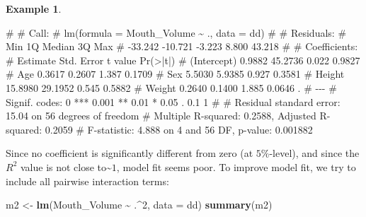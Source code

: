 \documentclass[
  a4paper,
]{article}
\newenvironment{Shaded}{\begin{snugshade}}{\end{snugshade}}
\newcommand{\AttributeTok}[1]{\textcolor[rgb]{0.13,0.29,0.53}{#1}}
\newcommand{\DecValTok}[1]{\textcolor[rgb]{0.00,0.00,0.81}{#1}}
\newcommand{\FunctionTok}[1]{\textcolor[rgb]{0.13,0.29,0.53}{\textbf{#1}}}
\newcommand{\NormalTok}[1]{#1}
\newcommand{\OtherTok}[1]{\textcolor[rgb]{0.56,0.35,0.01}{#1}}
\newcommand{\SpecialCharTok}[1]{\textcolor[rgb]{0.81,0.36,0.00}{\textbf{#1}}}
\theoremstyle{definition}
\theoremstyle{definition}
\newtheorem{example}{Example}[section]
\theoremstyle{definition}
\theoremstyle{definition}
\theoremstyle{remark}
\begin{document}
\begin{example}
\begin{Shaded}
\begin{Highlighting}[]
\NormalTok{\# }
\NormalTok{\# Call:}
\NormalTok{\# lm(formula = Mouth\_Volume \textasciitilde{} ., data = dd)}
\NormalTok{\# }
\NormalTok{\# Residuals:}
\NormalTok{\#     Min      1Q  Median      3Q     Max }
\NormalTok{\# {-}33.242 {-}10.721  {-}3.223   8.800  43.218 }
\NormalTok{\# }
\NormalTok{\# Coefficients:}
\NormalTok{\#             Estimate Std. Error t value Pr(\textgreater{}|t|)  }
\NormalTok{\# (Intercept)   0.9882    45.2736   0.022   0.9827  }
\NormalTok{\# Age           0.3617     0.2607   1.387   0.1709  }
\NormalTok{\# Sex           5.5030     5.9385   0.927   0.3581  }
\NormalTok{\# Height       15.8980    29.1952   0.545   0.5882  }
\NormalTok{\# Weight        0.2640     0.1400   1.885   0.0646 .}
\NormalTok{\# {-}{-}{-}}
\NormalTok{\# Signif. codes:  0 \textquotesingle{}***\textquotesingle{} 0.001 \textquotesingle{}**\textquotesingle{} 0.01 \textquotesingle{}*\textquotesingle{} 0.05 \textquotesingle{}.\textquotesingle{} 0.1 \textquotesingle{} \textquotesingle{} 1}
\NormalTok{\# }
\NormalTok{\# Residual standard error: 15.04 on 56 degrees of freedom}
\NormalTok{\# Multiple R{-}squared:  0.2588,  Adjusted R{-}squared:  0.2059 }
\NormalTok{\# F{-}statistic: 4.888 on 4 and 56 DF,  p{-}value: 0.001882}
\end{Highlighting}
\end{Shaded}

Since no coefficient is significantly different from zero (at \(5\%\)-level),
and since the \(R^2\) value is not close to\textasciitilde{}\(1\),
model fit seems poor. To improve model fit, we try to include all
pairwise interaction terms:

\begin{Shaded}
\begin{Highlighting}[]
\NormalTok{m2 }\OtherTok{\textless{}{-}} \FunctionTok{lm}\NormalTok{(Mouth\_Volume }\SpecialCharTok{\textasciitilde{}}\NormalTok{ .}\SpecialCharTok{\^{}}\DecValTok{2}\NormalTok{, }\AttributeTok{data =}\NormalTok{ dd)}
\FunctionTok{summary}\NormalTok{(m2)}
\end{Highlighting}
\end{Shaded}


\end{example}
\end{document}
